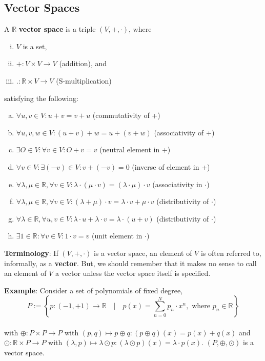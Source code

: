 \subsection{Vector Spaces}
\begin{definition}
A $\mathbb{R}$-\textbf{vector space} is a triple $(V, +, \cdot)$, where
\begin{enumerate}[i)]
\item $V$ is a set,
\item $+ : V \times V \to V$ \quad (addition), and
\item $. : \mathbb{R} \times V \to V$ \quad (S-multiplication)
\end{enumerate}
satisfying the following:
\begin{enumerate}[a)]
\item $\forall u, v \in V : u + v = v + u$ \quad (commutativity of +)
\item $\forall u, v, w \in V : (u + v) + w = u + (v + w)$ \quad (associativity of +)
\item $\exists O \in V : \forall v \in V : O + v = v$ \quad (neutral element in +)
\item $\forall v \in V : \exists (-v) \in V : v + (-v) = 0$ \quad (inverse of element in +)

\item $\forall \lambda, \mu \in \mathbb{R}, \forall v \in V : \lambda \cdot (\mu \cdot v) = (\lambda \cdot \mu) \cdot v$ \quad (associativity in $\cdot$)
\item $\forall \lambda, \mu \in \mathbb{R}, \forall v \in V : (\lambda + \mu) \cdot v = \lambda \cdot v + \mu \cdot v$ \quad (distributivity of $\cdot$)
\item $\forall \lambda \in \mathbb{R}, \forall u, v \in V : \lambda \cdot u + \lambda \cdot v = \lambda \cdot (u + v)$ \quad (distributivity of $\cdot$)
\item $\exists 1 \in \mathbb{R} : \forall v \in V : 1 \cdot v = v$ \quad (unit element in $\cdot$)
\end{enumerate}
\end{definition}

\textbf{Terminology}: If $(V,+,\cdot)$ is a vector space, an element of $V$ is often referred to, informally, as a \textbf{vector}. But, we should remember that it makes no sense to call an element of $V$ a vector unless the vector space itself is specified.

\textbf{Example}: Consider a set of polynomials of fixed degree,
\begin{equation*}
P := \left\lbrace p:(-1,+1) \to \mathbb{R} \quad \Big| \quad p(x) = \displaystyle\sum_{n=0}^{N} p_n \cdot x^n, \text{ where } p_n \in \mathbb{R} \right\rbrace
\end{equation*} \\
with $\oplus : P \times P \to P$ with $(p,q) \mapsto p \oplus q : (p \oplus q)(x) = p(x) + q(x)$ and \\
$\odot : \mathbb{R} \times P \to P$ with $(\lambda,p) \mapsto \lambda \odot p : (\lambda \odot p)(x) = \lambda \cdot p(x)$. \textbf{$(P,\oplus,\odot)$} is a vector space.

